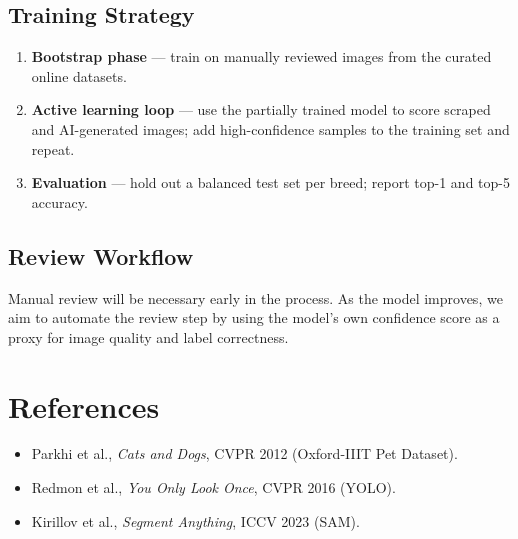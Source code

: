 \documentclass[10pt,twocolumn]{article}
\begin{document}
\subsection{Training Strategy}

\begin{enumerate}[noitemsep]
  \item \textbf{Bootstrap phase} --- train on manually reviewed images from
        the curated online datasets.
  \item \textbf{Active learning loop} --- use the partially trained model to
        score scraped and AI-generated images; add high-confidence samples to
        the training set and repeat.
  \item \textbf{Evaluation} --- hold out a balanced test set per breed;
        report top-1 and top-5 accuracy.
\end{enumerate}

\subsection{Review Workflow}

Manual review will be necessary early in the process. As the model improves,
we aim to automate the review step by using the model's own confidence score
as a proxy for image quality and label correctness.

\section*{References}

\begin{itemize}[noitemsep]
  \item Parkhi et al., \textit{Cats and Dogs}, CVPR 2012
        (Oxford-IIIT Pet Dataset).
  \item Redmon et al., \textit{You Only Look Once}, CVPR 2016 (YOLO).
  \item Kirillov et al., \textit{Segment Anything}, ICCV 2023 (SAM).
\end{itemize}
\end{document}
